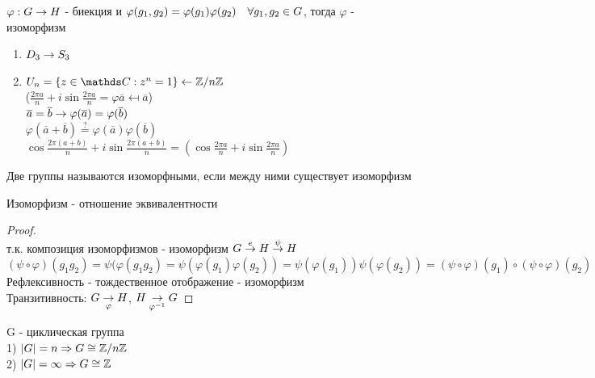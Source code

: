 \documentclass[12pt, fleqn]{article}
\begin{document}
\begin{definition}
    $\varphi: G \rightarrow H$ - биекция и $\varphi(g_1,g_2)=\varphi(g_1) \varphi(g_2)\quad \forall g_1,g_2 \in G$, тогда $\varphi$ - изоморфизм
\end{definition}

\begin{instance}
    \begin{enumerate}
        \item $D_3 \rightarrow S_3$
        \item $U_n=\{z\in \CC: z^n=1\} \la \Z / n \Z$\\
        ($\frac{2\pi a}{n}+i \sin \frac{2\pi a}{n} = \varphi \overline{a} \mapsfrom \overline{a}$)\\
        $\overline{a}=\overline{b} \rightarrow \varphi(\overline{a})=\varphi(\overline{b})$\\
        $\varphi(\overline{a}+\overline{b}) \overset{?}{=} \varphi(\overline{a})\varphi(\overline{b})$\\
        $\cos \frac{2\pi(a+b)}{n}+i \sin \frac{2\pi(a+b)}{n}=(\cos\frac{2\pi a}{n} + i \sin \frac{2\pi a}{n}) $
    \end{enumerate}
\end{instance}

\begin{definition}
    Две группы называются изоморфными, если между ними существует изоморфизм
\end{definition}

\begin{utv}
    Изоморфизм - отношение эквивалентности
\end{utv}

\begin{proof} \ \\
    т.к. композиция изоморфизмов - изоморфизм $G \overset{e}{\rightarrow} H \overset{\psi}{\rightarrow} H$\\
    $(\psi \circ \varphi)(g_1 g_2)= \psi(\varphi(g_1 g_2)=\psi(\varphi(g_1) \varphi(g_2))=\psi(\varphi(g_1)) \psi(\varphi(g_2)) = (\psi \circ \varphi)(g_1) \circ (\psi \circ \varphi)(g_2)$\\
    Рефлексивность - тождественное отображение - изоморфизм\\
    Транзитивность: $G \underset{\varphi}{\rightarrow} H$, $H \underset{\varphi^{-1}}{\rightarrow} G$
\end{proof}

\begin{theorem}
    G - циклическая группа\\
    1) $|G|=n \Rightarrow G \cong \mathbb{Z} / n \mathbb{Z}$\\
    2) $|G|=\infty \Rightarrow G \cong \mathbb{Z}$
\end{theorem}
\end{document}
